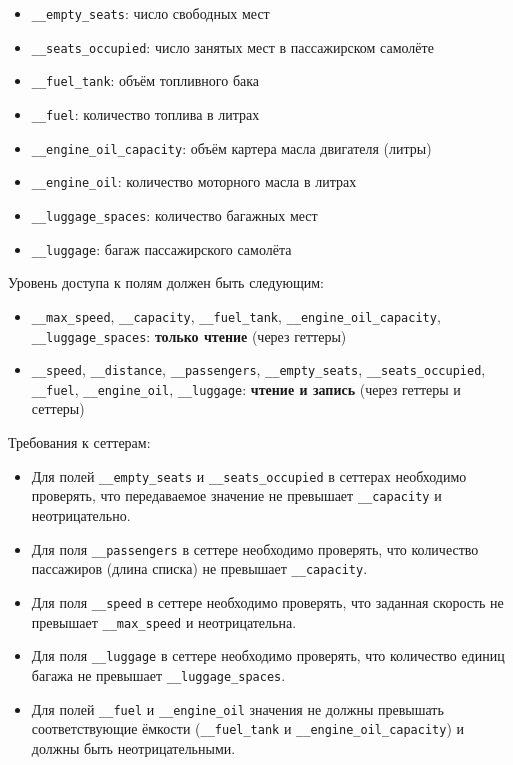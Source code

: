 \begin{enumerate}
\begin{itemize}
    \item \texttt{\_\_empty\_seats}: число свободных мест  
    \item \texttt{\_\_seats\_occupied}: число занятых мест в пассажирском самолёте  
    \item \texttt{\_\_fuel\_tank}: объём топливного бака  
    \item \texttt{\_\_fuel}: количество топлива в литрах  
    \item \texttt{\_\_engine\_oil\_capacity}: объём картера масла двигателя (литры)  
    \item \texttt{\_\_engine\_oil}: количество моторного масла в литрах  
    \item \texttt{\_\_luggage\_spaces}: количество багажных мест  
    \item \texttt{\_\_luggage}: багаж пассажирского самолёта  
\end{itemize}
Уровень доступа к полям должен быть следующим:
\begin{itemize}
    \item \texttt{\_\_max\_speed}, \texttt{\_\_capacity}, \texttt{\_\_fuel\_tank}, \texttt{\_\_engine\_oil\_capacity}, \texttt{\_\_luggage\_spaces}: \textbf{только чтение} (через геттеры)  
    \item \texttt{\_\_speed}, \texttt{\_\_distance}, \texttt{\_\_passengers}, \texttt{\_\_empty\_seats}, \texttt{\_\_seats\_occupied}, \texttt{\_\_fuel}, \texttt{\_\_engine\_oil}, \texttt{\_\_luggage}: \textbf{чтение и запись} (через геттеры и сеттеры)
\end{itemize}
Требования к сеттерам:
\begin{itemize}
    \item Для полей \texttt{\_\_empty\_seats} и \texttt{\_\_seats\_occupied} в сеттерах необходимо проверять, что передаваемое значение не превышает \texttt{\_\_capacity} и неотрицательно.  
    \item Для поля \texttt{\_\_passengers} в сеттере необходимо проверять, что количество пассажиров (длина списка) не превышает \texttt{\_\_capacity}.  
    \item Для поля \texttt{\_\_speed} в сеттере необходимо проверять, что заданная скорость не превышает \texttt{\_\_max\_speed} и неотрицательна.  
    \item Для поля \texttt{\_\_luggage} в сеттере необходимо проверять, что количество единиц багажа не превышает \texttt{\_\_luggage\_spaces}.
    \item Для полей \texttt{\_\_fuel} и \texttt{\_\_engine\_oil} значения не должны превышать соответствующие ёмкости (\texttt{\_\_fuel\_tank} и \texttt{\_\_engine\_oil\_capacity}) и должны быть неотрицательными.

\end{itemize}
\end{enumerate}
